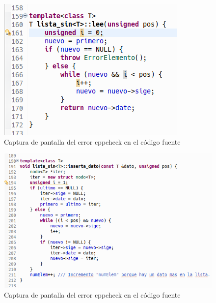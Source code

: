 			\begin{figure}[H]
				\centering
				\includegraphics[scale=0.55]{img/captura74.png}
				\caption{Captura de pantalla del error cppcheck en el código fuente}
				\label{captura74}
			\end{figure}
		
			\begin{figure}[H]
				\centering
				\includegraphics[scale=0.55]{img/captura67.png}
				\caption{Captura de pantalla del error cppcheck en el código fuente}
				\label{captura67}
			\end{figure}
		
